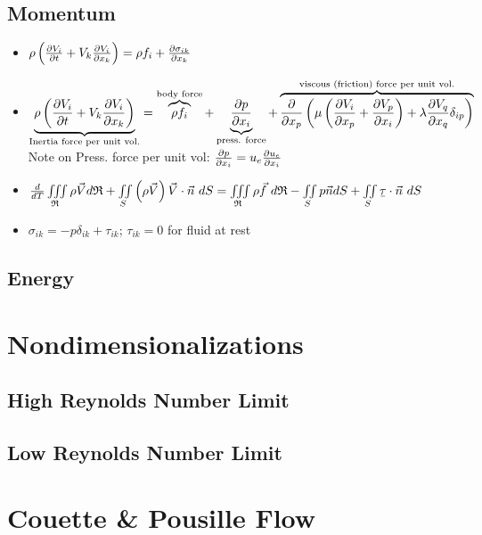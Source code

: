 \documentclass[a4paper]{article}
\begin{document}
    \subsection{Momentum} 
        \begin{itemize}
            \item $\rho \left( \frac{\partial V_i}{\partial t} + V_k \frac{\partial V_i}{\partial x_k} \right) = \rho f_i + \frac{\partial \sigma_{ik}}{\partial x_k}$
            \item $\underbrace{\rho \left( \partderiv{V_i}{t} + V_k \partderiv{V_i}{x_k} \right)}_\text{Inertia force per unit vol.} = %
            \overbrace{\rho f_i}^{\text{body force}} +%
            \underbrace{\partderiv{p}{x_i}}_\text{press. force}+%
            \overbrace{\partderiv{}{x_p}\left( \mu \left( \partderiv{V_i}{x_p} + \partderiv{V_p}{x_i} \right) + \lambda \partderiv{V_q}{x_q} \delta_{ip} \right)}^\text{viscous (friction) force per unit vol.}$ \\
            Note on Press. force per unit vol: $\frac{\partial p}{\partial x_i} = u_e \frac{\partial u_e}{\partial x_i}$
            \item $\frac{d}{dT} \iiint\limits_{\mathfrak{R}} \rho\vec{V} d\mathfrak{R} + %
            \iint\limits_{S} \left(\rho \vec{V}\right) \vec{V} \cdot \vec{n}\ dS = \iiint\limits_{\mathfrak{R}} \rho \vec{f}\ d\mathfrak{R}%
            - \iint\limits_{S} p \vec{n} dS + \iint\limits_{S} \barbelow{\tau} \cdot \vec{n}\ dS$
            \item $\sigma_{ik} = -p \delta_{ik} + \tau_{ik}$; $\tau_{ik} = 0$ for fluid at rest
        \end{itemize}
    \subsection{Energy}

\section{Nondimensionalizations}
    \subsection{High Reynolds Number Limit}
    \subsection{Low Reynolds Number Limit}

\section{Couette \& Pousille Flow} 
\end{document}
